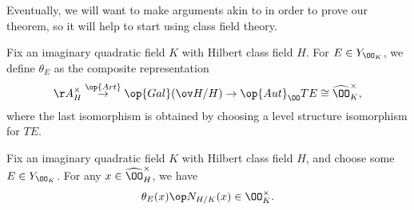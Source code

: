 \documentclass[../notes.tex]{subfiles}
\begin{document}
Eventually, we will want to make arguments akin to  in order to prove our theorem, so it will help to start using class field theory.
\begin{notation}
	Fix an imaginary quadratic field $K$ with Hilbert class field $H$. For $E\in Y_{\OO_K}$, we define $\theta_E$ as the composite representation
	\[\AA_H^\times\stackrel{\op{Art}}\to\op{Gal}(\ov H/H)\to\op{Aut}_\OO TE\cong\widehat\OO_K^\times,\]
	where the last isomorphism is obtained by choosing a level structure isomorphism for $TE$.
\end{notation}
\begin{lemma} \label{lem:relate-theta-to-units}
	Fix an imaginary quadratic field $K$ with Hilbert class field $H$, and choose some $E\in Y_{\OO_K}$. For any $x\in\widehat\OO_H^\times$, we have
	\[\theta_E(x)\op N_{H/K}(x)\in\OO_K^\times.\]
\end{lemma}
\end{document}
